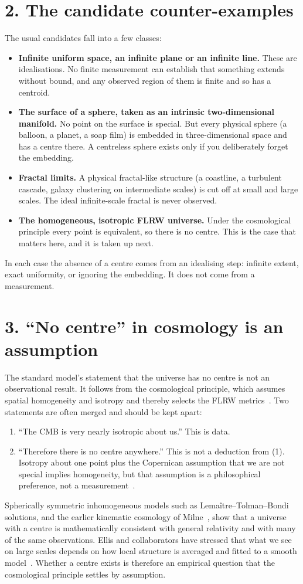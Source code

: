 \documentclass[11pt,a4paper]{article}
\begin{document}
\section*{2. The candidate counter-examples}
The usual candidates fall into a few classes:
\begin{itemize}
\item \textbf{Infinite uniform space, an infinite plane or an infinite line.} These are idealisations. No finite measurement can establish that something extends without bound, and any observed region of them is finite and so has a centroid.
\item \textbf{The surface of a sphere, taken as an intrinsic two-dimensional manifold.} No point on the surface is special. But every physical sphere (a balloon, a planet, a soap film) is embedded in three-dimensional space and has a centre there. A centreless sphere exists only if you deliberately forget the embedding.
\item \textbf{Fractal limits.} A physical fractal-like structure (a coastline, a turbulent cascade, galaxy clustering on intermediate scales) is cut off at small and large scales. The ideal infinite-scale fractal is never observed.
\item \textbf{The homogeneous, isotropic FLRW universe.} Under the cosmological principle every point is equivalent, so there is no centre. This is the case that matters here, and it is taken up next.
\end{itemize}
In each case the absence of a centre comes from an idealising step: infinite extent, exact uniformity, or ignoring the embedding. It does not come from a measurement.
\section*{3. ``No centre'' in cosmology is an assumption}
The standard model's statement that the universe has no centre is not an observational result. It follows from the cosmological principle, which assumes spatial homogeneity and isotropy and thereby selects the FLRW metrics~\cite{rindler,ellis79}. Two statements are often merged and should be kept apart:
\begin{enumerate}
\item ``The CMB is very nearly isotropic about us.'' This is data.
\item ``Therefore there is no centre anywhere.'' This is not a deduction from (1). Isotropy about one point plus the Copernican assumption that we are not special implies homogeneity, but that assumption is a philosophical preference, not a measurement~\cite{ellis79,ellis02}.
\end{enumerate}
Spherically symmetric inhomogeneous models such as Lema\^itre--Tolman--Bondi solutions, and the earlier kinematic cosmology of Milne~\cite{milne}, show that a universe with a centre is mathematically consistent with general relativity and with many of the same observations. Ellis and collaborators have stressed that what we see on large scales depends on how local structure is averaged and fitted to a smooth model~\cite{ellis02,ellisstoeger}. Whether a centre exists is therefore an empirical question that the cosmological principle settles by assumption.
\end{document}
